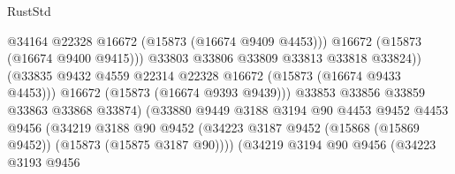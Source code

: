 \begin{lexlean}{RustStd}
\begin{coremodule}
                                                @34164
                                                @22328
                                                @16672
                                                (@15873 (@16674 @9409 @4453)))
                                              @16672
                                              (@15873 (@16674 @9400 @9415)))
                                            @33803
                                            @33806
                                            @33809
                                            @33813
                                            @33818
                                            @33824))
                                        (@33835
                                          @9432
                                          @4559
                                          @22314
                                          @22328
                                          @16672
                                          (@15873 (@16674 @9433 @4453)))
                                        @16672
                                        (@15873 (@16674 @9393 @9439)))
                                      @33853
                                      @33856
                                      @33859
                                      @33863
                                      @33868
                                      @33874)
                                    (@33880
                                      @9449
                                      @3188
                                      @3194
                                      @90
                                      @4453
                                      @9452
                                      @4453
                                      @9456
                                      (@34219
                                        @3188
                                        @90
                                        @9452
                                        (@34223
                                          @3187
                                          @9452
                                          (@15868 (@15869 @9452))
                                          (@15873 (@15875 @3187 @90))))
                                      (@34219
                                        @3194
                                        @90
                                        @9456
                                        (@34223
                                          @3193
                                          @9456

\end{coremodule}
\end{lexlean}

